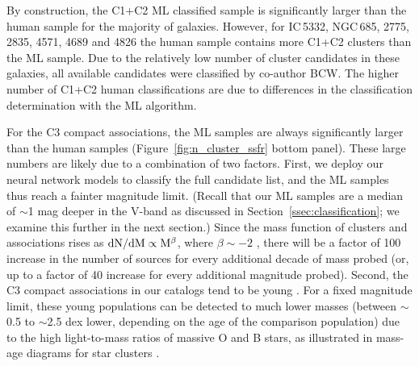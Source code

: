 \documentclass[linenumbers]{aastex63}
\begin{document}
By construction, the C1+C2 ML classified sample is significantly larger than the human sample for the majority of galaxies. 
However, for IC\,5332, NGC\,685, 2775, 2835, 4571, 4689 and 4826 the human sample contains more C1+C2 clusters than the ML sample. Due to the relatively low number of cluster candidates in these galaxies, all available candidates were classified by co-author BCW. The higher number of C1+C2 human classifications are due to differences in the classification determination with the ML algorithm.

For the C3 compact associations, the ML samples are always significantly larger than the human samples (Figure~\ref{fig:n_cluster_ssfr} bottom panel). 
These large numbers are likely due to a combination of two factors.
First, we deploy our neural network models to classify the full candidate list, and the ML samples thus reach a fainter magnitude limit.  (Recall that our ML samples are a median of $\sim$1 mag deeper in the V-band as discussed in Section~\ref{ssec:classification}; we examine this further in the next section.)  Since the mass function of clusters and associations rises as $\rm{dN/dM} \propto M{^\beta}$, where $\beta\sim-2$ \citep[and references therein]{krumholz_star_2019}, there will be a factor of 100 increase in the number of sources for every additional decade of mass probed (or, up to a factor of 40 increase for every additional magnitude probed).  Second, the C3 compact associations in our catalogs tend to be young \citep[$\lesssim$10 Myr, e.g.,][see also Sec~\ref{ssect:cc_regions}]{lee_phangs-hst_2022}.  For a fixed magnitude limit, these young populations can be detected to much lower masses (between $\sim$0.5 to $\sim$2.5 dex lower, depending on the age of the comparison population) due to the high light-to-mass ratios of massive O and B stars, as illustrated in mass-age diagrams for star clusters \citep[e.g.,][Figure 13]{cook_star_2019}.  

\end{document}
